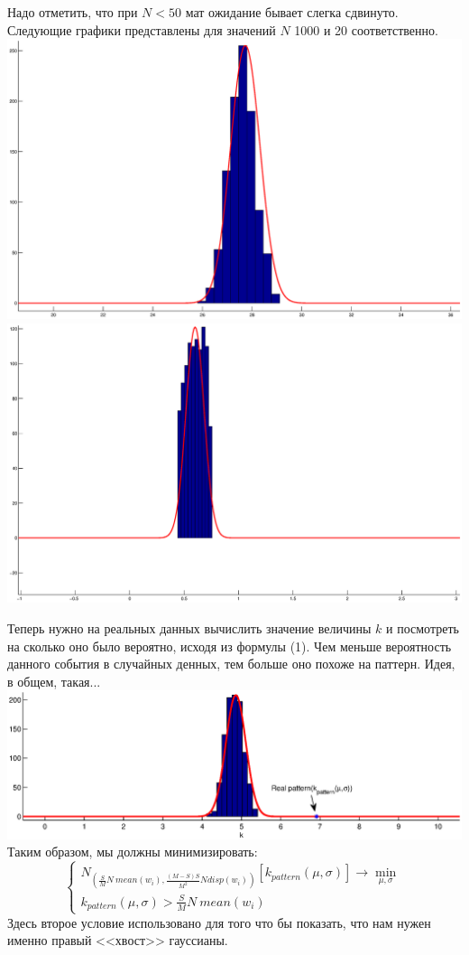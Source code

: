 \documentclass[12pt]{letter}
\begin{document}
Надо отметить, что при  $ N < 50 $ мат ожидание бывает слегка сдвинуто. Следующие графики представлены для значений $N$ 1000 и 20 соответственно.\\
\includegraphics[width=200mm]{norm.eps}
\includegraphics[width=200mm]{norm20.eps}

Теперь нужно на реальных данных вычислить значение величины $k$ и посмотреть на сколько оно было вероятно, исходя из формулы (1). 
Чем меньше вероятность данного события в случайных денных, тем больше оно похоже на паттерн. Идея, в общем, такая...\\
\includegraphics[width=200mm]{pattern.eps}
Таким образом, мы должны минимизировать:
$$
\left\{
\begin{aligned}
N_{\left(  \frac SM N~ mean({w_i}), \frac{(M-S)S}{M^2}N disp(w_i)  \right)}[k_{pattern}(\mu,\sigma)] \to \min_{\mu,\sigma}\\
k_{pattern}(\mu,\sigma) > \frac SM N~ mean({w_i})
\end{aligned}
\right.
$$
Здесь второе условие использовано для того что бы показать, что нам нужен именно правый <<хвост>> гауссианы.
\end{document}
